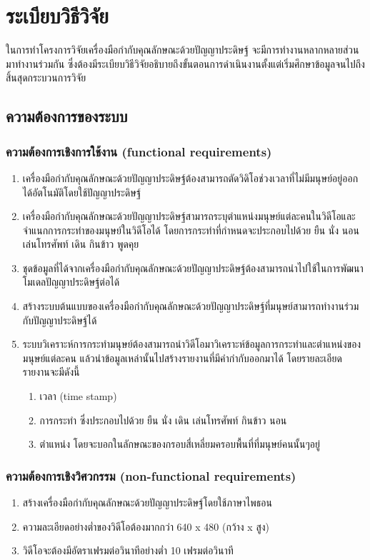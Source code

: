 \chapter{ระเบียบวิธีวิจัย}
ในการทําโครงการวิจัยเครื่องมือกำกับคุณลักษณะด้วยปัญญาประดิษฐ์ จะมีการทำงานหลากหลายส่วนมาทำงานร่วมกัน 
ซึ่งต้องมีระเบียบวิธีวิจัยอธิบายถึงขั้นตอนการดำเนินงานตั้งแต่เริ่มศึกษาข้อมูลจนไปถึงสิ้นสุดกระบวนการวิจัย
\section{ความต้องการของระบบ}
\subsection{ความต้องการเชิงการใช้งาน (functional requirements)}
\begin{enumerate}
	\setlength\itemsep{-0.25em}
    \item เครื่องมือกำกับคุณลักษณะด้วยปัญญาประดิษฐ์ต้องสามารถตัดวิดิโอช่วงเวลาที่ไม่มีมนุษย์อยู่ออกได้อัตโนมัติโดยใช้ปัญญาประดิษฐ์ 
	\item เครื่องมือกำกับคุณลักษณะด้วยปัญญาประดิษฐ์สามารถระบุตำแหน่งมนุษย์แต่ละคนในวิดีโอและจำแนกการกระทำของมนุษย์ในวิดีโอได้ 
	โดยการกระทำที่กำหนดจะประกอบไปด้วย ยืน นั่ง นอน เล่นโทรศัพท์ เดิน กินข้าว พูดคุย
	\item ชุดข้อมูลที่ได้จากเครื่องมือกำกับคุณลักษณะด้วยปัญญาประดิษฐ์ต้องสามารถนำไปใช้ในการพัฒนาโมเดลปัญญาประดิษฐ์ต่อได้ 
	\item สร้างระบบต้นแบบของเครื่องมือกำกับคุณลักษณะด้วยปัญญาประดิษฐ์ที่มนุษย์สามารถทำงานร่วมกับปัญญาประดิษฐ์ได้
	\item ระบบวิเคราะห์การกระทำมนุษย์ต้องสามารถนำวิดีโอมาวิเคราะห์ข้อมูลการกระทำและตำแหน่งของมนุษย์แต่ละคน แล้วนำข้อมูลเหล่านั้นไปสร้างรายงานที่มีคำกำกับออกมาได้ โดยรายละเอียดรายงานจะมีดังนี้
	\begin{enumerate}
		\item เวลา (time stamp)
		\item การกระทำ ซึ่งประกอบไปด้วย ยืน นั่ง เดิน เล่นโทรศัพท์ กินข้าว นอน
		\item ตำแหน่ง โดยจะบอกในลักษณะของกรอบสี่เหลี่ยมครอบพื้นที่ที่มนุษย์คนนั้นๆอยู่
	\end{enumerate}
\end{enumerate}
\subsection{ความต้องการเชิงวิศวกรรม (non-functional requirements)}
\begin{enumerate}
	\setlength\itemsep{-0.25em}
	\item สร้างเครื่องมือกำกับคุณลักษณะด้วยปัญญาประดิษฐ์โดยใช้ภาษาไพธอน
	\item ความละเอียดอย่างต่ำของวิดีโอต้องมากกว่า 640 x 480 (กว้าง x สูง) 
	\item วิดีโอจะต้องมีอัตราเฟรมต่อวินาทีอย่างต่ำ 10 เฟรมต่อวินาที
\end{enumerate}
\clearpage


